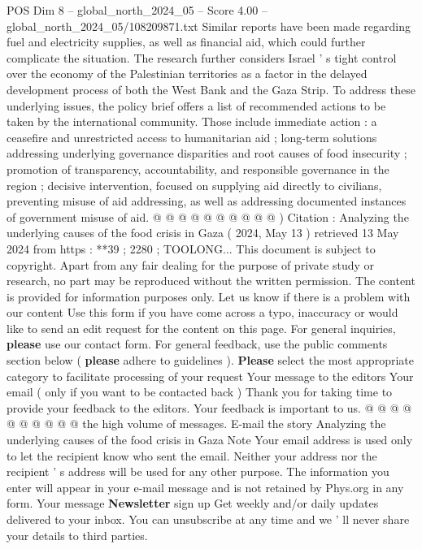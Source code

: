 \begin{textsample}{POS Dim 8 – global\_north\_2024\_05 – Score 4.00 – global\_north\_2024\_05/108209871.txt}
Similar reports have been made regarding fuel and electricity supplies, as well as financial aid, which could further complicate the situation.
The research further considers Israel ' s tight control over the economy of the Palestinian territories as a factor in the delayed development process of both the West Bank and the Gaza Strip.
To address these underlying issues, the policy brief offers a list of recommended actions to be taken by the international community.
Those include immediate action : a ceasefire and unrestricted access to humanitarian aid ; long-term solutions addressing underlying governance disparities and root causes of food insecurity ; promotion of transparency, accountability, and responsible governance in the region ; decisive intervention, focused on supplying aid directly to civilians, preventing misuse of aid addressing, as well as addressing documented instances of government misuse of aid. @ @ @ @ @ @ @ @ @ @ ) Citation : Analyzing the underlying causes of the food crisis in Gaza ( 2024, May 13 ) retrieved 13 May 2024 from https : **39 ; 2280 ; TOOLONG...
This document is subject to copyright.
Apart from any fair dealing for the purpose of private study or research, no part may be reproduced without the written permission.
The content is provided for information purposes only.
Let us know if there is a problem with our content Use this form if you have come across a typo, inaccuracy or would like to send an edit request for the content on this page.
For general inquiries, \textbf{please} use our contact form.
For general feedback, use the public comments section below ( \textbf{please} adhere to guidelines ). \textbf{Please} select the most appropriate category to facilitate processing of your request Your message to the editors Your email ( only if you want to be contacted back ) Thank you for taking time to provide your feedback to the editors.
Your feedback is important to us. @ @ @ @ @ @ @ @ @ @ the high volume of messages.
E-mail the story Analyzing the underlying causes of the food crisis in Gaza Note Your email address is used only to let the recipient know who sent the email.
Neither your address nor the recipient ' s address will be used for any other purpose.
The information you enter will appear in your e-mail message and is not retained by Phys.org in any form.
Your message \textbf{Newsletter} sign up Get weekly and/or daily updates delivered to your inbox.
You can unsubscribe at any time and we ' ll never share your details to third parties.

\end{textsample}
